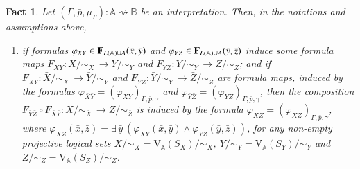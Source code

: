 \documentclass[12pt]{article}
\newtheorem{fact}{Fact}
\theoremstyle{definition}
\def\MA{{\mathbb{A}}}
\def\MB{{\mathbb{B}}}
\def\V{{\mathrm{V}}}
\begin{document}
\begin{fact}\label{fact17}
Let $(\Gamma,\bar p,\mu_\Gamma)\colon\MA\rightsquigarrow\MB$ be an interpretation. Then, in the notations and assumptions above, 
\begin{enumerate}[label=(F\arabic*)]\addtocounter{enumi}{6}
    \item\label{F7} if formulas $\varphi_{XY}\in {\bf F}_{L(\MA)\cup A}(\bar x,\bar y)$ and $\varphi_{YZ}\in {\bf F}_{L(\MA)\cup A}(\bar y,\bar z)$ induce some formula maps $F_{XY}\colon X/{\sim_X}\, \to Y/{\sim_Y}$ and $F_{YZ}\colon Y/{\sim_Y}\, \to Z/{\sim_Z}$; and if $F_{\bar X \bar Y}\colon \bar X/{\sim_{\bar X}} \,\to \bar Y/{\sim_{\bar Y}}$ and $F_{\bar Y \bar Z}\colon \bar Y/{\sim_{\bar Y}} \,\to \bar Z/{\sim_{\bar Z}}$ are formula maps, induced by the formulas $\varphi_{\bar X \bar Y}=(\varphi_{XY})_{\Gamma, \bar p, \gamma}$ and $\varphi_{\bar Y \bar Z}=(\varphi_{YZ})_{\Gamma, \bar p, \gamma}$, then the composition $F_{\bar Y \bar Z}\circ F_{\bar X \bar Y}\colon\bar X/{\sim_{\bar X}} \,\to \bar Z/{\sim_{\bar Z}}$ is induced by the formula $\varphi_{\bar X \bar Z}=(\varphi_{XZ})_{\Gamma, \bar p, \gamma}$, where $\varphi_{XZ}(\bar x,\bar z)=\exists\,\bar y \:(\varphi_{XY}(\bar x,\bar y) \wedge \varphi_{YZ}(\bar y,\bar z))$, for any non-empty projective logical sets $X/{\sim_X}=\V_\MA(S_X)/{\sim_X}$, $Y/{\sim_Y}=\V_\MA(S_Y)/{\sim_Y}$ and $Z/{\sim_Z}=\V_\MA(S_Z)/{\sim_Z}$.
\end{enumerate}
\end{fact}
\end{document}
